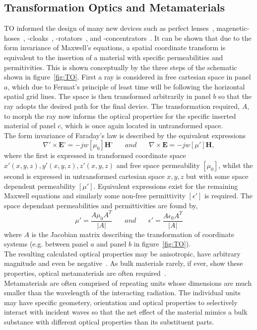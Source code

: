 \documentclass[11pt]{iopart}
\begin{document}
\subsection{Transformation Optics and Metamaterials}
TO informed the design of many new devices such as perfect
lenses~\cite{Pendry2000}, magenetic-hoses~\cite{Navau2014}, -cloaks~\cite{Sun2017},
-rotators~\cite{Sun2017}, and -concentrators~\cite{Navau2012}. It
can be shown that due to the form invariance of Maxwell's equations, a
spatial coordinate transform is equivalent to the insertion of a
material with specific permeabilities and permitivities. This is shown
conceptually by the three steps of the schematic shown in
figure~\ref{fig:TO}. First a ray is considered in free cartesian space
in panel $a$, which due to Fermat's principle of least time will be
following the horizontal spatial grid lines.  The space is then
transformed arbitrarily in panel $b$ so that the ray adopts the
desired path for the final device. The transformation required, $A$,
to morph the ray now informs the optical properties for the specific
inserted material of panel $c$, which is once again located in
untransformed space.\\ The form invariance of Faraday's law is
described by the equivalent expressions
\begin{equation}
  \label{ME1}
  \nabla'\times \textbf{E'} = -jw[\mu_0]\textbf{H'}
  ~~~~~~~~and~~~~~~~~
  \nabla\times \textbf{E} = -jw[\mu']\textbf{H},
\end{equation}
where the first is expressed in transformed coordinate space $x'(x, y,
z), y'(x, y, z), z'(x, y, z)$ and free space permeability $[\mu_0]$,
whilst the second is expressed in untransformed cartesian space $x, y,
z$ but with some space dependent permeability $[\mu']$.  Equivalent
expressions exist for the remaining Maxwell equations and similarly
some non-free permittivity $[\epsilon']$ is required. The space
dependant permeabilities and permittivities are found by,
\begin{equation}
  \label{eqn:J}
  \mu'=\frac{A\mu_0 A^T}{|A|}
  ~~~~~~~~and~~~~~~~~
  \epsilon'=\frac{A\epsilon_0 A^T}{|A|}
\end{equation}
where $A$ is the Jacobian matrix describing the transformation of
coordinate systems (e.g. between panel $a$ and panel $b$ in
figure~\ref{fig:TO}). \\ The resulting calculated optical properties
may be anisotropic, have arbitrary magnitude and even be
negative~\cite{Pendry2000}. As bulk materials rarely, if ever, show these
properties, optical metamaterials are often
required~\cite{Smith2004}. \\ Metamaterials are often comprised of
repeating units whose dimensions are much smaller than the wavelength
of the interacting radiation. The individual units may
have specific geometery, orientation and optical properties to
selectively interact with incident waves so that the net effect of the
material mimics a bulk substance with different optical properties
than its substituent parts.\\
\end{document}
